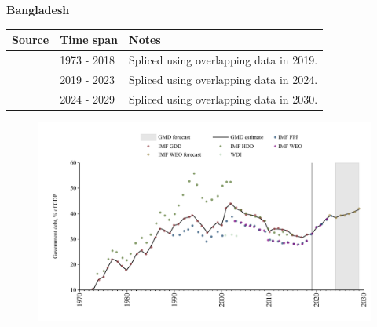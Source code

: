\documentclass[12pt,a4paper,landscape]{article}
\begin{document}
\begin{adjustbox}{max totalsize={\paperwidth}{\paperheight},center}
\begin{minipage}[t][\textheight][t]{\textwidth}
\vspace*{0.5cm}
{}
\begin{center}
{\Large\bfseries Bangladesh}
\end{center}
\vspace{0.5cm}
\begin{table}[H]
\centering
\small
\begin{tabular}{|l|l|l|}
\hline
\textbf{Source} & \textbf{Time span} & \textbf{Notes} \\
\hline
\rowcolor{white}\cite{IMF_GDD}& 1973 - 2018 &Spliced using overlapping data in 2019.\\
\rowcolor{lightgray}\cite{IMF_FPP}& 2019 - 2023 &Spliced using overlapping data in 2024.\\
\rowcolor{white}\cite{IMF_WEO_forecast}& 2024 - 2029 &Spliced using overlapping data in 2030.\\
\hline
\end{tabular}
\end{table}
\begin{figure}[H]
\centering
\includegraphics[width=\textwidth,height=0.6\textheight,keepaspectratio]{graphs/BGD_govdebt_GDP.pdf}
\end{figure}
\end{minipage}
\end{adjustbox}
\end{document}
